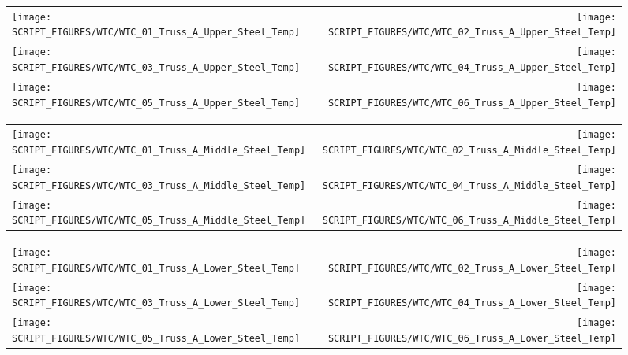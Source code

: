 \begin{figure}[p]
\begin{tabular*}{\textwidth}{l@{\extracolsep{\fill}}r}
\texttt{[image: SCRIPT\_FIGURES/WTC/WTC\_01\_Truss\_A\_Upper\_Steel\_Temp]} &
\texttt{[image: SCRIPT\_FIGURES/WTC/WTC\_02\_Truss\_A\_Upper\_Steel\_Temp]} \\
\texttt{[image: SCRIPT\_FIGURES/WTC/WTC\_03\_Truss\_A\_Upper\_Steel\_Temp]} &
\texttt{[image: SCRIPT\_FIGURES/WTC/WTC\_04\_Truss\_A\_Upper\_Steel\_Temp]} \\
\texttt{[image: SCRIPT\_FIGURES/WTC/WTC\_05\_Truss\_A\_Upper\_Steel\_Temp]} &
\texttt{[image: SCRIPT\_FIGURES/WTC/WTC\_06\_Truss\_A\_Upper\_Steel\_Temp]}
\end{tabular*}
\label{NIST_WTC_Truss_A_Upper_Steel_Temp}
\end{figure}

\begin{figure}[p]
\begin{tabular*}{\textwidth}{l@{\extracolsep{\fill}}r}
\texttt{[image: SCRIPT\_FIGURES/WTC/WTC\_01\_Truss\_A\_Middle\_Steel\_Temp]} &
\texttt{[image: SCRIPT\_FIGURES/WTC/WTC\_02\_Truss\_A\_Middle\_Steel\_Temp]} \\
\texttt{[image: SCRIPT\_FIGURES/WTC/WTC\_03\_Truss\_A\_Middle\_Steel\_Temp]} &
\texttt{[image: SCRIPT\_FIGURES/WTC/WTC\_04\_Truss\_A\_Middle\_Steel\_Temp]} \\
\texttt{[image: SCRIPT\_FIGURES/WTC/WTC\_05\_Truss\_A\_Middle\_Steel\_Temp]} &
\texttt{[image: SCRIPT\_FIGURES/WTC/WTC\_06\_Truss\_A\_Middle\_Steel\_Temp]}
\end{tabular*}
\label{NIST_WTC_Truss_A_Middle_Steel_Temp}
\end{figure}

\begin{figure}[p]
\begin{tabular*}{\textwidth}{l@{\extracolsep{\fill}}r}
\texttt{[image: SCRIPT\_FIGURES/WTC/WTC\_01\_Truss\_A\_Lower\_Steel\_Temp]} &
\texttt{[image: SCRIPT\_FIGURES/WTC/WTC\_02\_Truss\_A\_Lower\_Steel\_Temp]} \\
\texttt{[image: SCRIPT\_FIGURES/WTC/WTC\_03\_Truss\_A\_Lower\_Steel\_Temp]} &
\texttt{[image: SCRIPT\_FIGURES/WTC/WTC\_04\_Truss\_A\_Lower\_Steel\_Temp]} \\
\texttt{[image: SCRIPT\_FIGURES/WTC/WTC\_05\_Truss\_A\_Lower\_Steel\_Temp]} &
\texttt{[image: SCRIPT\_FIGURES/WTC/WTC\_06\_Truss\_A\_Lower\_Steel\_Temp]}
\end{tabular*}
\label{NIST_WTC_Truss_A_Lower_Steel_Temp}
\end{figure}

